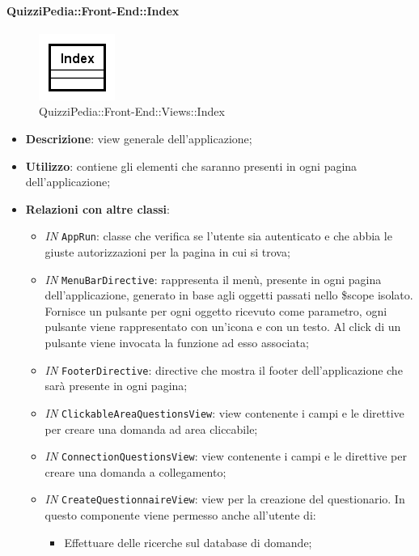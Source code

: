 	
	\paragraph{QuizziPedia::Front-End::Index}
	\begin{figure} [ht]
		\centering
		\includegraphics[scale=0.80]{UML/Classi/Front-End/QuizziPedia_Front-end_Views_Index.png}
		\caption{QuizziPedia::Front-End::Views::Index}
	\end{figure} \FloatBarrier
	\begin{itemize}
		\item \textbf{Descrizione}: view generale dell'applicazione;
		\item \textbf{Utilizzo}: contiene gli elementi che saranno presenti in ogni pagina dell'applicazione;
		\item \textbf{Relazioni con altre classi}:
		\begin{itemize}
			\item \textit{IN} \texttt{AppRun}: classe che verifica se l'utente sia autenticato e che abbia le giuste autorizzazioni per la pagina in cui si trova;
			\item \textit{IN} \texttt{MenuBarDirective}: rappresenta il menù, presente in ogni pagina dell'applicazione, generato in base agli oggetti passati nello \$scope isolato. Fornisce un pulsante per ogni oggetto ricevuto come parametro, ogni pulsante viene rappresentato con un’icona e con un testo. Al click di un pulsante viene invocata la funzione ad esso associata;
			\item \textit{IN} \texttt{FooterDirective}: directive che mostra il footer dell'applicazione che sarà presente in ogni pagina;
			\item \textit{IN} \texttt{ClickableAreaQuestionsView}: view contenente i campi e le direttive per creare una domanda ad area cliccabile;
			\item \textit{IN} \texttt{ConnectionQuestionsView}: view contenente i campi e le direttive per creare una domanda a collegamento;
			\item \textit{IN} \texttt{CreateQuestionnaireView}: view per la creazione del questionario. In questo componente viene permesso anche all'utente di:
			\begin{itemize}
				\item Effettuare delle ricerche sul database di domande;

\end{itemize}
\end{itemize}
\end{itemize}
